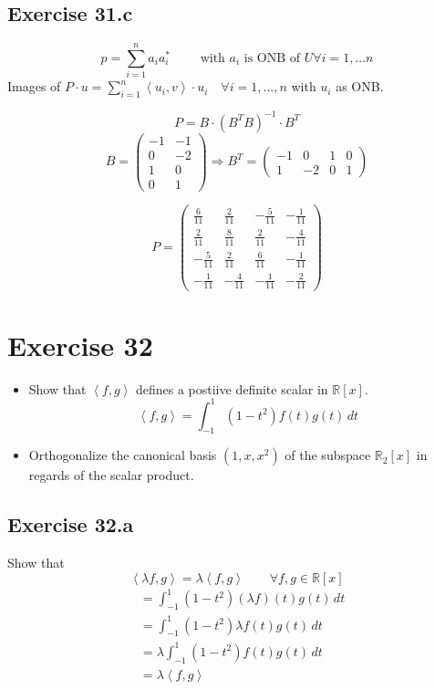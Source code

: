 \documentclass[a4paper]{article}
\theoremstyle{definition}
\newcommand\fun[1]{\left\langle{#1}\right\rangle}
\begin{document}
\subsection{Exercise 31.c}
\[ p = \sum_{i=1}^n a_i a_i^* \qquad \text{ with } a_i \text{ is ONB of } U \forall i = 1, \ldots n \]
Images of $P \cdot u = \sum_{i=1}^n \fun{u_i, v} \cdot u_i \quad \forall i = 1,\ldots,n$ with $u_i$ as ONB.

\[ P = B \cdot (B^T B)^{-1} \cdot B^T \]
\[
  B = \begin{pmatrix} -1 & -1 \\ 0 & -2 \\ 1 & 0 \\ 0 & 1 \end{pmatrix}
  \Rightarrow B^T = \begin{pmatrix} -1 & 0 & 1 & 0 \\ 1 & -2 & 0 & 1 \end{pmatrix}
\]

\[
  P = \begin{pmatrix}
    \frac6{11} & \frac2{11} & -\frac5{11} & -\frac1{11} \\
    \frac2{11} & \frac8{11} & \frac2{11} & -\frac4{11} \\
    -\frac5{11} & \frac2{11} & \frac6{11} & -\frac{1}{11} \\
    -\frac1{11} & -\frac4{11} & -\frac1{11} & -\frac2{11}
  \end{pmatrix}
\]

\section{Exercise 32}
\begin{ex}
  \begin{itemize}
    \item Show that $\fun{f,g}$ defines a postiive definite scalar in $\mathbb R[x]$.
      \[ \fun{f,g} = \int_{-1}^1 (1 - t^2) f(t) g(t) \, dt \]
    \item Orthogonalize the canonical basis $(1, x, x^2)$ of the subspace $\mathbb R_2[x]$ in regards of the scalar product.
  \end{itemize}
\end{ex}

\subsection{Exercise 32.a}
Show that
\[ \fun{\lambda f, g} = \lambda \fun{f,g} \qquad \forall f,g \in \mathbb R[x] \]
\begin{align*}
  &= \int_{-1}^1 (1 - t^2) (\lambda f)(t) g(t) \, dt \\
  &= \int_{-1}^1 (1 - t^2) \lambda f(t) g(t) \, dt \\
  &= \lambda \int_{-1}^1 (1 - t^2) f(t) g(t) \, dt \\
  &= \lambda \fun{f, g}
\end{align*}
\end{document}
